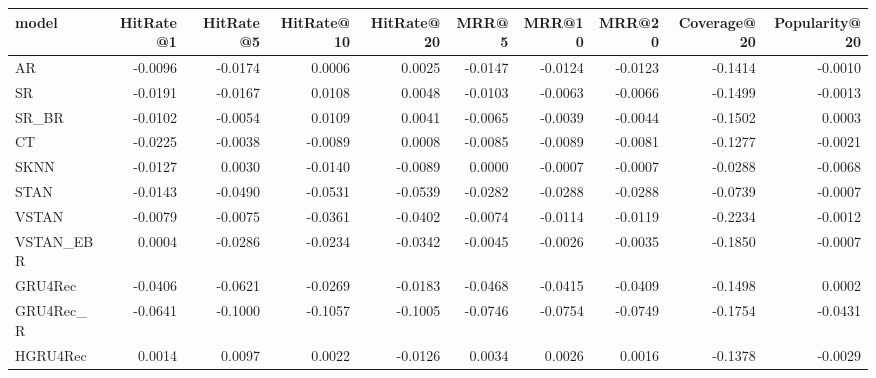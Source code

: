 \begin{tabular}{lrrrrrrrrr}
\toprule
     model &  HitRate@1 &  HitRate@5 &  HitRate@10 &  HitRate@20 &   MRR@5 &  MRR@10 &  MRR@20 &  Coverage@20 &  Popularity@20 \\
\midrule
        AR &    -0.0096 &    -0.0174 &      0.0006 &      0.0025 & -0.0147 & -0.0124 & -0.0123 &      -0.1414 &        -0.0010 \\
        SR &    -0.0191 &    -0.0167 &      0.0108 &      0.0048 & -0.0103 & -0.0063 & -0.0066 &      -0.1499 &        -0.0013 \\
     SR\_BR &    -0.0102 &    -0.0054 &      0.0109 &      0.0041 & -0.0065 & -0.0039 & -0.0044 &      -0.1502 &         0.0003 \\
        CT &    -0.0225 &    -0.0038 &     -0.0089 &      0.0008 & -0.0085 & -0.0089 & -0.0081 &      -0.1277 &        -0.0021 \\
      SKNN &    -0.0127 &     0.0030 &     -0.0140 &     -0.0089 &  0.0000 & -0.0007 & -0.0007 &      -0.0288 &        -0.0068 \\
      STAN &    -0.0143 &    -0.0490 &     -0.0531 &     -0.0539 & -0.0282 & -0.0288 & -0.0288 &      -0.0739 &        -0.0007 \\
     VSTAN &    -0.0079 &    -0.0075 &     -0.0361 &     -0.0402 & -0.0074 & -0.0114 & -0.0119 &      -0.2234 &        -0.0012 \\
 VSTAN\_EBR &     0.0004 &    -0.0286 &     -0.0234 &     -0.0342 & -0.0045 & -0.0026 & -0.0035 &      -0.1850 &        -0.0007 \\
   GRU4Rec &    -0.0406 &    -0.0621 &     -0.0269 &     -0.0183 & -0.0468 & -0.0415 & -0.0409 &      -0.1498 &         0.0002 \\
 GRU4Rec\_R &    -0.0641 &    -0.1000 &     -0.1057 &     -0.1005 & -0.0746 & -0.0754 & -0.0749 &      -0.1754 &        -0.0431 \\
  HGRU4Rec &     0.0014 &     0.0097 &      0.0022 &     -0.0126 &  0.0034 &  0.0026 &  0.0016 &      -0.1378 &        -0.0029 \\
\bottomrule
\end{tabular}
